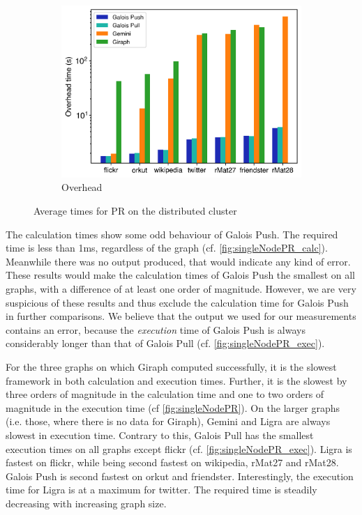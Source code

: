 \begin{figure}[h]
\begin{subfigure}{0.32\textwidth}
		\includegraphics[width=\linewidth]{../../plots/distributedPR_overheadTime.png}
		\caption{Overhead}
		\label{fig:distributedPR_overhead}
	\end{subfigure}
	\hfil
	\caption{Average times for PR on the distributed cluster}
	\label{fig:distributedPR}
\end{figure}

The calculation times show some odd behaviour of Galois Push. The required time is less than 1ms, regardless of the graph (cf. \autoref{fig:singleNodePR_calc}). Meanwhile there was no output produced, that would indicate any kind of error. These results would make the calculation times of Galois Push the smallest on all graphs, with a difference of at least one order of magnitude. However, we are very suspicious of these results and thus exclude the calculation time for Galois Push in further comparisons. 
We believe that the output we used for our measurements contains an error,
because the \emph{execution} time of Galois Push is always considerably longer than that of Galois Pull (cf. \autoref{fig:singleNodePR_exec}).

For the three graphs on which Giraph computed successfully, it is the slowest framework in both calculation and execution times. Further, it is the slowest by three orders of magnitude in the calculation time and one to two orders of magnitude in the execution time (cf \autoref{fig:singleNodePR}). On the larger graphs (i.e. those, where there is no data for Giraph), Gemini and Ligra are always slowest in execution time.
Contrary to this, Galois Pull has the smallest execution times on all graphs except flickr (cf. \autoref{fig:singleNodePR_exec}). Ligra is fastest on flickr, while being second fastest on wikipedia, rMat27 and rMat28. Galois Push is second fastest on orkut and friendster.
Interestingly, the execution time for Ligra is at a maximum for twitter. The required time is steadily decreasing with increasing graph size.



